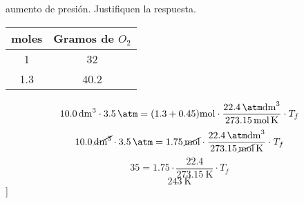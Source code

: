 \documentclass[../Práctica.root.tex]{subfiles}
\begin{document}
\begin{enumerate}
\begin{enumerate}
                    aumento de presión. Justifiquen la respuesta.
                    \begin{center}
                        \begin{tabular}{ c | c }
                            moles     & Gramos de $O_2$ \\
                            \hline
                            1         & 32              \\
                            \num{1,3} & \num{40,2}
                        \end{tabular}
                        \[
                            \SI{10,0}{\dm\cubed}\cdot\SI{3,5}{\atm}
                            = (\num{1,3} + \num{0,45})\si{\mole}
                            \cdot\frac{\SI{22,4}{\atm\dm\cubed}}{\SI{273,15}{\mole\kelvin}}
                            \cdot T_f
                        \]
                        \[
                            \SI{10,0}{\cancel\dm\cubed}\cdot\SI{3,5}{\cancel\atm}
                            = \SI{1,75}{\cancel\mole}
                            \cdot\frac{\SI{22,4}{\cancel\atm\cancel\dm\cubed}}{\SI{273,15}{\cancel\mole\kelvin}}
                            \cdot T_f
                        \]
                        \[ \num{35} = \SI{1,75}\cdot\frac{\num{22,4}}{\SI{273,15}{\kelvin}}\cdot T_f \]
                        \[ \boxed{\SI{243}{\kelvin}} \]]
                    \end{center}
          \end{enumerate}
\end{enumerate}
\end{document}
